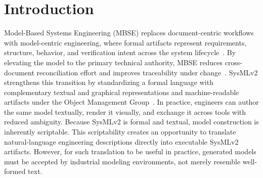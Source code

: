 \documentclass[colorlinks,upint,subscriptcorrection,varvw,hyphenate,balance]{asmeconf} %
\begin{document}
\begin{abstract}


\end{abstract}


\section{Introduction}


Model-Based Systems Engineering (MBSE) replaces document-centric workflows with model-centric engineering, where formal artifacts represent requirements, structure, behavior, and verification intent across the system lifecycle~\cite{estefan2008mbse,madni2018mbse}. By elevating the model to the primary technical authority, MBSE reduces cross-document reconciliation effort and improves traceability under change~\cite{madni2018mbse,incoseSEVision2035}. SysMLv2 strengthens this transition by standardizing a formal language with complementary textual and graphical representations and machine-readable artifacts under the Object Management Group~\cite{omgSysMLv2Spec2024}. In practice, engineers can author the same model textually, render it visually, and exchange it across tools with reduced ambiguity. Because SysMLv2 is formal and textual, model construction is inherently scriptable. This scriptability creates an opportunity to translate natural-language engineering descriptions directly into executable SysMLv2 artifacts. However, for such translation to be useful in practice, generated models must be accepted by industrial modeling environments, not merely resemble well-formed text.
\end{document}
